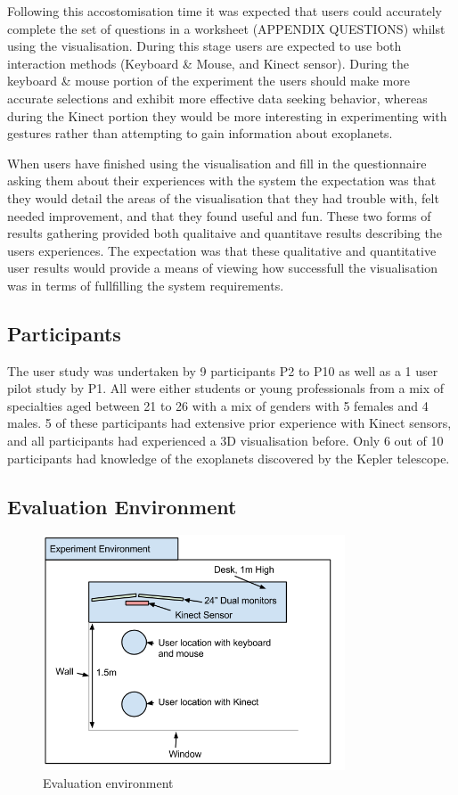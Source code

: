 Following this accostomisation time it was expected that users could accurately
complete the set of questions in a worksheet (APPENDIX QUESTIONS) whilst using
the visualisation. During this stage users are expected to use both interaction
methods (Keyboard \& Mouse, and Kinect sensor). During the keyboard \& mouse
portion of the experiment the users should make more accurate selections and
exhibit more effective data seeking behavior, whereas during the Kinect portion
they would be more interesting in experimenting with gestures rather than
attempting to gain information about exoplanets.

When users have finished using the visualisation and fill in the questionnaire
asking them about their experiences with the system the expectation was that
they would detail the areas of the visualisation that they had trouble with,
felt needed improvement, and that they found useful and fun. These two forms of
results gathering provided both qualitaive and quantitave results describing the
users experiences.
The expectation was that these qualitative and quantitative user results would
provide a means of viewing how successfull the visualisation was in terms of
fullfilling the system requirements.

\subsection{Participants}
The user study was undertaken by 9 participants P2 to P10 as well as a 1 user
pilot study by P1. All were either students or
young professionals from a mix of specialties aged between 21 to 26 with a mix
of genders with 5 females and 4 males. 5 of these participants had extensive
prior experience with Kinect sensors, and all participants had experienced a 3D
visualisation before. Only 6 out of 10 participants had knowledge of the
exoplanets discovered by the Kepler telescope.

\subsection{Evaluation Environment}
\begin{figure}[H]
  \centering
      \includegraphics[width=0.8\textwidth]{images/environment.png}
  \caption{Evaluation environment}  
    \label{fig:environment}
\end{figure}


